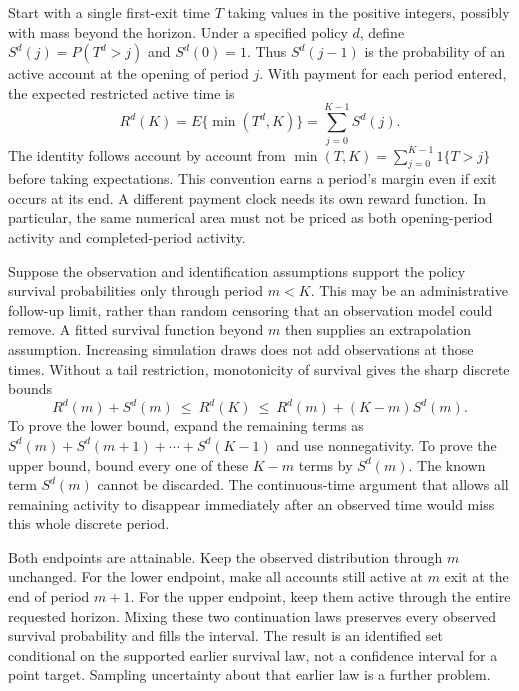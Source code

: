 Start with a single first-exit time $T$ taking values in the positive integers,
possibly with mass beyond the horizon. Under a specified policy $d$, define
$S^d(j)=P(T^d>j)$ and $S^d(0)=1$. Thus $S^d(j-1)$ is the probability of an
active account at the opening of period $j$. With payment for each period
entered, the expected restricted active time is
\begin{equation}
 R^d(K)=E\{\min(T^d,K)\}
       =\sum_{j=0}^{K-1}S^d(j).
 \label{exec17:s5-restricted-time}
\end{equation}
The identity follows account by account from
$\min(T,K)=\sum_{j=0}^{K-1}1\{T>j\}$ before taking expectations. This convention
earns a period's margin even if exit occurs at its end. A different payment
clock needs its own reward function. In particular, the same numerical area
must not be priced as both opening-period activity and completed-period
activity.

Suppose the observation and identification assumptions support the policy
survival probabilities only through period $m<K$. This may be an administrative
follow-up limit, rather than random censoring that an observation model could
remove. A fitted survival function beyond $m$ then supplies an extrapolation
assumption. Increasing simulation draws does not add observations at those
times. Without a tail restriction, monotonicity of survival gives the sharp
discrete bounds
\begin{equation}
 R^d(m)+S^d(m)\ \leq\ R^d(K)\ \leq\
 R^d(m)+(K-m)S^d(m).
 \label{exec17:s5-tail-bounds}
\end{equation}
To prove the lower bound, expand the remaining terms as
$S^d(m)+S^d(m+1)+\cdots+S^d(K-1)$ and use nonnegativity. To prove the upper
bound, bound every one of these $K-m$ terms by $S^d(m)$. The known term
$S^d(m)$ cannot be discarded. The continuous-time argument that allows all
remaining activity to disappear immediately after an observed time would
miss this whole discrete period.

Both endpoints are attainable. Keep the observed distribution through $m$
unchanged. For the lower endpoint, make all accounts still active at $m$ exit
at the end of period $m+1$. For the upper endpoint, keep them active through
the entire requested horizon. Mixing these two continuation laws preserves
every observed survival probability and fills the interval. The result is an
identified set conditional on the supported earlier survival law, not a
confidence interval for a point target. Sampling uncertainty about that earlier
law is a further problem.

